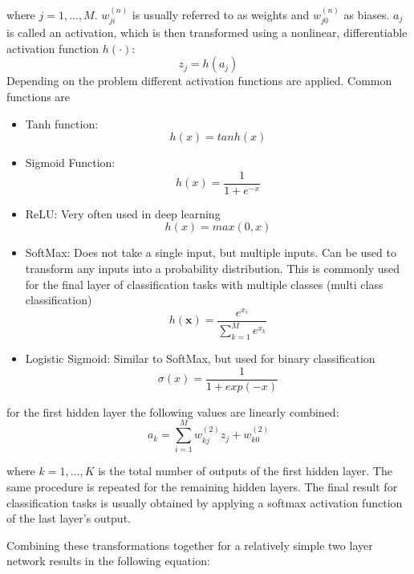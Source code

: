 \documentclass[draft,final,oneside]{vutinfth} %
\begin{document}
where $j = 1, ..., M$. $w_{ji}^{(n)}$ is usually referred to as weights and $w_{j0}^{(n)}$ as biases. $a_j$ is called an activation, which is then transformed using a nonlinear, differentiable activation function $h(\cdot)$:
\begin{equation}
z_j = h(a_j)
\end{equation}
Depending on the problem different activation functions are applied. Common functions are
\begin{itemize}
\item Tanh function:
\begin{equation}
h(x) = tanh(x)
\end{equation}
\item Sigmoid Function:
\begin{equation}
h(x) = \dfrac {1} {1 + e^{-x}}
\end{equation}
\item ReLU: Very often used in deep learning
\begin{equation}
h(x) = max(0, x)
\end{equation}
\item SoftMax: Does not take a single input, but multiple inputs. Can be used to transform any inputs into a probability distribution. This is commonly used for the final layer of classification tasks with multiple classes (multi class classification)
\begin{equation}
h(\boldsymbol{x}) = \dfrac{e^{x_i}}{\sum_{k=1}^{M} e^{x_k}}
\end{equation}
\item Logistic Sigmoid: Similar to SoftMax, but used for binary classification
\begin{equation}
\sigma(x) = \dfrac{1}{1 + exp(-x)}
\end{equation}
\end{itemize}


for the first hidden layer the following values are linearly combined:
\begin{equation}
a_k = \sum_{i=1}^{M} w_{kj}^{(2)}z_j + w_{k0}^{(2)}
\end{equation}

where $k = 1, ..., K$ is the total number of outputs of the first hidden layer. The same procedure is repeated for the remaining hidden layers. The final result for classification tasks is usually obtained by applying a softmax activation function of the last layer's output.

Combining these transformations together for a relatively simple two layer network results in the following equation:
\end{document}
